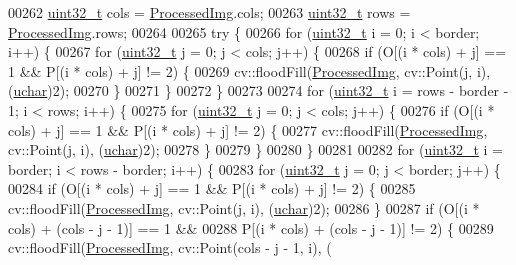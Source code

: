 \begin{DoxyCode}
00262   \hyperlink{_soil_math_types_8h_a435d1572bf3f880d55459d9805097f62}{uint32\_t} cols = \hyperlink{class_vision_1_1_image_processing_aa7d65742882cd1b2a1e4e9cb68809211}{ProcessedImg}.cols;
00263   \hyperlink{_soil_math_types_8h_a435d1572bf3f880d55459d9805097f62}{uint32\_t} rows = \hyperlink{class_vision_1_1_image_processing_aa7d65742882cd1b2a1e4e9cb68809211}{ProcessedImg}.rows;
00264 
00265   \textcolor{keywordflow}{try} \{
00266     \textcolor{keywordflow}{for} (\hyperlink{_soil_math_types_8h_a435d1572bf3f880d55459d9805097f62}{uint32\_t} i = 0; i < border; i++) \{
00267       \textcolor{keywordflow}{for} (\hyperlink{_soil_math_types_8h_a435d1572bf3f880d55459d9805097f62}{uint32\_t} j = 0; j < cols; j++) \{
00268         \textcolor{keywordflow}{if} (O[(i * cols) + j] == 1 && P[(i * cols) + j] != 2) \{
00269           cv::floodFill(\hyperlink{class_vision_1_1_image_processing_aa7d65742882cd1b2a1e4e9cb68809211}{ProcessedImg}, cv::Point(j, i), (\hyperlink{_soil_math_types_8h_a65f85814a8290f9797005d3b28e7e5fc}{uchar})2);
00270         \}
00271       \}
00272     \}
00273 
00274     \textcolor{keywordflow}{for} (\hyperlink{_soil_math_types_8h_a435d1572bf3f880d55459d9805097f62}{uint32\_t} i = rows - border - 1; i < rows; i++) \{
00275       \textcolor{keywordflow}{for} (\hyperlink{_soil_math_types_8h_a435d1572bf3f880d55459d9805097f62}{uint32\_t} j = 0; j < cols; j++) \{
00276         \textcolor{keywordflow}{if} (O[(i * cols) + j] == 1 && P[(i * cols) + j] != 2) \{
00277           cv::floodFill(\hyperlink{class_vision_1_1_image_processing_aa7d65742882cd1b2a1e4e9cb68809211}{ProcessedImg}, cv::Point(j, i), (\hyperlink{_soil_math_types_8h_a65f85814a8290f9797005d3b28e7e5fc}{uchar})2);
00278         \}
00279       \}
00280     \}
00281 
00282     \textcolor{keywordflow}{for} (\hyperlink{_soil_math_types_8h_a435d1572bf3f880d55459d9805097f62}{uint32\_t} i = border; i < rows - border; i++) \{
00283       \textcolor{keywordflow}{for} (\hyperlink{_soil_math_types_8h_a435d1572bf3f880d55459d9805097f62}{uint32\_t} j = 0; j < border; j++) \{
00284         \textcolor{keywordflow}{if} (O[(i * cols) + j] == 1 && P[(i * cols) + j] != 2) \{
00285           cv::floodFill(\hyperlink{class_vision_1_1_image_processing_aa7d65742882cd1b2a1e4e9cb68809211}{ProcessedImg}, cv::Point(j, i), (\hyperlink{_soil_math_types_8h_a65f85814a8290f9797005d3b28e7e5fc}{uchar})2);
00286         \}
00287         \textcolor{keywordflow}{if} (O[(i * cols) + (cols - j - 1)] == 1 &&
00288             P[(i * cols) + (cols - j - 1)] != 2) \{
00289           cv::floodFill(\hyperlink{class_vision_1_1_image_processing_aa7d65742882cd1b2a1e4e9cb68809211}{ProcessedImg}, cv::Point(cols - j - 1, i), (

\end{DoxyCode}
